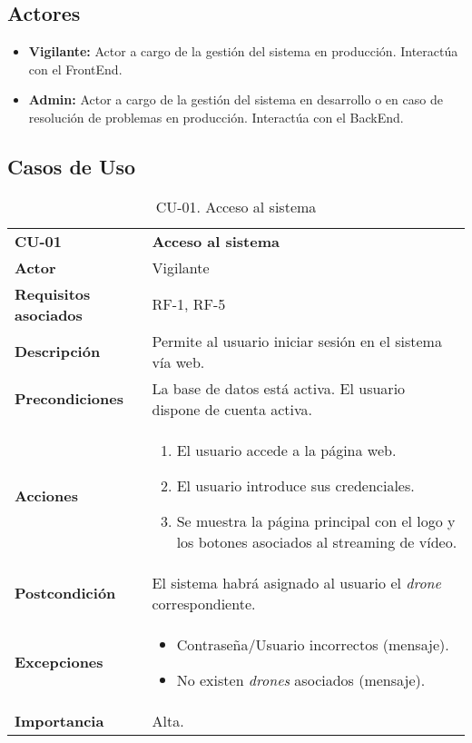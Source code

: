 \subsection{Actores}

\begin{itemize}
\item \textbf{Vigilante:} Actor a cargo de la gestión del sistema en producción. Interactúa con el FrontEnd.
\item \textbf{Admin:} Actor a cargo de la gestión del sistema en desarrollo o en caso de resolución de problemas en producción. Interactúa con el BackEnd.
\end{itemize}

\subsection{Casos de Uso}

\begin{table}
	\begin{center}
		\begin{tabular}{m{3cm}  m{10cm}}\hline
			\toprule
			\textbf{CU-01} & \textbf{Acceso al sistema}\\
			\otoprule
			\textbf{Actor} & Vigilante\\
			\textbf{Requisitos asociados} & RF-1, RF-5\\
			\textbf{Descripción} & Permite al usuario iniciar sesión en el sistema vía web.\\
			\textbf{Precondiciones} & La base de datos está activa. El usuario dispone de cuenta activa.\\
			\textbf{Acciones} & \begin{enumerate}
											\item El usuario accede a la página web.
											\item El usuario introduce sus credenciales.
											\item Se muestra la página principal con el logo y los botones asociados al streaming de vídeo.
											\end{enumerate}\\
			
			\textbf{Postcondición} & El sistema habrá asignado al usuario el \emph{drone} correspondiente. \\
			\textbf{Excepciones} & \begin{itemize}
												\item Contraseña/Usuario incorrectos (mensaje).
												\item No existen \emph{drones} asociados (mensaje).
												\end{itemize}\\
			\textbf{Importancia} & Alta.\\
			\hline
			\bottomrule
		\end{tabular}
		\caption{CU-01. Acceso al sistema}
		\label{tb:CU01}
	\end{center}
\end{table}



